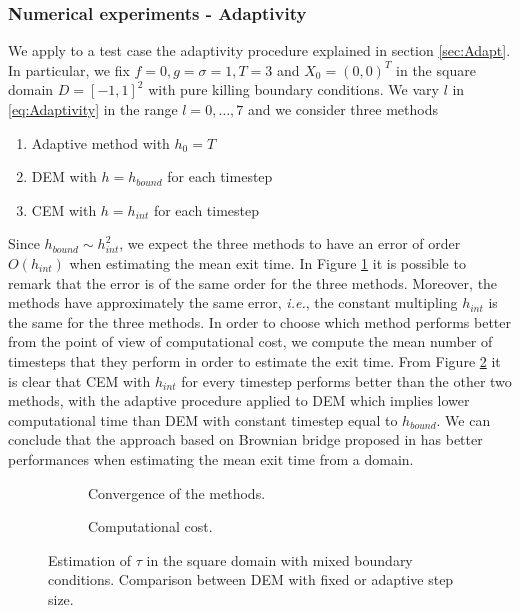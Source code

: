 \subsubsection{Numerical experiments - Adaptivity}
We apply to a test case the adaptivity procedure explained in section \ref{sec:Adapt}. In particular, we fix $f = 0, g = \sigma = 1, T = 3$ and $X_0 = (0,0)^T$ in the square domain $D = \left[-1,1\right]^2$ with pure killing boundary conditions. We vary $l$ in \eqref{eq:Adaptivity} in the range $l = 0, \dots, 7$ and we consider three methods
\begin{enumerate}
	\item Adaptive method with $h_0 = T$
	\item DEM with $h = h_{bound}$ for each timestep
	\item CEM with $h = h_{int}$ for each timestep
\end{enumerate}
Since $h_{bound} \sim h_ {int}^2$, we expect the three methods to have an error of order $O(h_{int})$ when estimating the mean exit time. In Figure \ref{fig:AdaptErr} it is possible to remark that the error is of the same order for the three methods. Moreover, the methods have approximately the same error, \textit{i.e.}, the constant multipling $h_{int}$ is the same for the three methods. In order to choose which method performs better from the point of view of computational cost, we compute the mean number of timesteps that they perform in order to estimate the exit time. From Figure \ref{fig:AdaptCost} it is clear that CEM with $h_{int}$ for every timestep performs better than the other two methods, with the adaptive procedure applied to DEM which implies lower computational time than DEM with constant timestep equal to $h_{bound}$. We can conclude that the approach based on Brownian bridge proposed in \cite{Gobet2001} has better performances when estimating the mean exit time from a domain.

\begin{figure}[t]
    \centering
    \begin{subfigure}{0.49\linewidth}
        \centering
        \resizebox{1\linewidth}{!}{ }  
        \caption{Convergence of the methods.}
        \label{fig:AdaptErr}
    \end{subfigure}
    \begin{subfigure}{0.49\linewidth}
        \centering
        \resizebox{1\linewidth}{!}{ }  
        \caption{Computational cost.}
        \label{fig:AdaptCost}
    \end{subfigure}    
    \caption{Estimation of $\tau$ in the square domain with mixed boundary conditions. Comparison between DEM with fixed or adaptive step size.}
    \label{fig:AdaptResults}
\end{figure}

